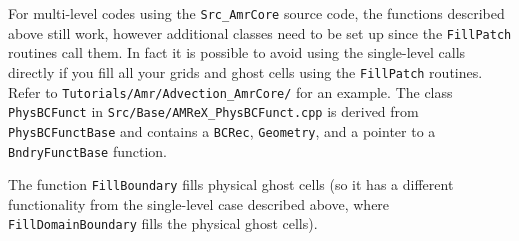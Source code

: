 For multi-level codes using the {\tt Src\_AmrCore} source code, the
functions described above still work, however additional classes need to
be set up since the {\tt FillPatch} routines call them.
In fact it is possible to avoid using the single-level calls directly if
you fill all your grids and ghost cells using the {\tt FillPatch} routines.
Refer to {\tt Tutorials/Amr/Advection\_AmrCore/} for an example.
The class {\tt PhysBCFunct} in {\tt Src/Base/AMReX\_PhysBCFunct.cpp}
is derived from {\tt PhysBCFunctBase} and contains a {\tt BCRec}, {\tt Geometry},
and a pointer to a {\tt BndryFunctBase} function.

The function {\tt FillBoundary} fills physical ghost cells (so it has a different
functionality from the single-level case described above, where {\tt FillDomainBoundary}
fills the physical ghost cells).
